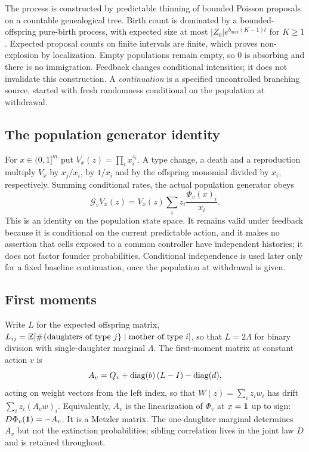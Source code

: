 The process is constructed by predictable thinning of bounded Poisson proposals
on a countable genealogical tree. Birth count is dominated by a
bounded-offspring pure-birth process, with expected size at most
$|Z_0|e^{b_{\max}(K-1)t}$ for $K\ge1$. Expected proposal counts on finite
intervals are finite, which proves non-explosion by localization. Empty
populations remain empty, so $0$ is absorbing and there is no immigration.
Feedback changes conditional intensities; it does not invalidate this
construction. A \emph{continuation} is a specified uncontrolled branching
source, started with fresh randomness conditional on the population at
withdrawal.

\subsection{The population generator identity}

For $x\in(0,1]^m$ put $V_x(z)=\prod_ix_i^{z_i}$. A type change, a death and a
reproduction multiply $V_x$ by $x_j/x_i$, by $1/x_i$ and by the offspring
monomial divided by $x_i$, respectively. Summing conditional rates, the actual
population generator obeys
\begin{equation}\label{eq:generator}
 \mathcal G_vV_x(z)=V_x(z)\sum_iz_i\frac{\Phi_v(x)_i}{x_i}.
\end{equation}
This is an identity on the population state space. It remains valid under
feedback because it is conditional on the current predictable action, and it
makes no assertion that cells exposed to a common controller have independent
histories; it does not factor founder probabilities. Conditional independence
is used later only for a fixed baseline continuation, once the population at
withdrawal is given.

\subsection{First moments}
\label{sec:firstmoment}

Write $L$ for the expected offspring matrix, $L_{ij}=\mathbb E[\#\{\text{daughters of
type }j\}\mid\text{mother of type }i]$, so that $L=2\Lambda$ for binary division
with single-daughter marginal $\Lambda$. The first-moment matrix at constant
action $v$ is
\begin{equation}\label{eq:meanmatrix}
 A_v=Q_v+\operatorname{diag}(b)\,(L-I)-\operatorname{diag}(d),
\end{equation}
acting on weight vectors from the left index, so that $W(z)=\sum_iz_iw_i$ has
drift $\sum_iz_i(A_vw)_i$. Equivalently, $A_v$ is the linearization of $\Phi_v$
at $x=\mathbf1$ up to sign: $D\Phi_v(\mathbf1)=-A_v$. It is a Metzler matrix. The
one-daughter marginal determines $A_v$ but not the extinction probabilities;
sibling correlation lives in the joint law $D$ and is retained throughout.

